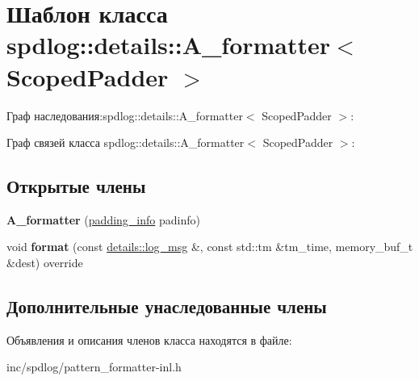\hypertarget{classspdlog_1_1details_1_1A__formatter}{}\section{Шаблон класса spdlog\+:\+:details\+:\+:A\+\_\+formatter$<$ Scoped\+Padder $>$}
\label{classspdlog_1_1details_1_1A__formatter}


Граф наследования\+:spdlog\+:\+:details\+:\+:A\+\_\+formatter$<$ Scoped\+Padder $>$\+:


Граф связей класса spdlog\+:\+:details\+:\+:A\+\_\+formatter$<$ Scoped\+Padder $>$\+:
\subsection*{Открытые члены}
\begin{DoxyCompactItemize}
\item 
\mbox{\label{classspdlog_1_1details_1_1A__formatter_a352cb8c757604f6e7fbea65103c9cace}} 
{\bfseries A\+\_\+formatter} (\hyperlink{structspdlog_1_1details_1_1padding__info}{padding\+\_\+info} padinfo)
\item 
\mbox{\label{classspdlog_1_1details_1_1A__formatter_a6f05661d11df0bac9d22e41e0fce9318}} 
void {\bfseries format} (const \hyperlink{structspdlog_1_1details_1_1log__msg}{details\+::log\+\_\+msg} \&, const std\+::tm \&tm\+\_\+time, memory\+\_\+buf\+\_\+t \&dest) override
\end{DoxyCompactItemize}
\subsection*{Дополнительные унаследованные члены}


Объявления и описания членов класса находятся в файле\+:\begin{DoxyCompactItemize}
\item 
inc/spdlog/pattern\+\_\+formatter-\/inl.\+h\end{DoxyCompactItemize}
